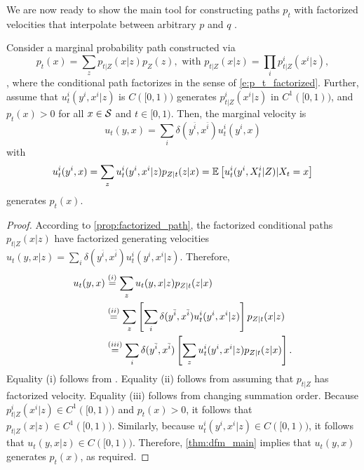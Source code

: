 \documentclass{fairmeta}
\renewcommand{\eqref}[1]{\labelcref{#1}}
\numberwithin{equation}{section}
\begin{document}
We are now ready to show the main tool for constructing paths $p_t$ with factorized velocities that interpolate between arbitrary $p$ and $q$ \citep{campbell2024generative,gat2024discrete}.

\begin{myframe}\begin{theorem}\label{thm:factorized_conditional_marginals}
        Consider a marginal probability path constructed via
        \begin{equation}
    p_t(x)=\sum_z p_{t|Z}(x|z)p_Z(z), \text{ with } p_{t|Z}(x|z)=\prod_i p_{t|Z}^i(x^i|z),  
\end{equation}
\ie, where the conditional path factorizes in the sense of \cref{e:p_t_factorized}. Further, assume that $u_t^i(y^i,x^i|z)$ is $C([0,1))$ generates $p_{t|Z}^i(x^i|z)$ in $C^1([0,1))$, and $p_t(x)>0$ for all $x\in {\mathcal{S}}$ and $t\in[0,1)$. Then, the marginal velocity is \begin{equation}\label{e:u_t_factorized}
            u_t(y,x) = \sum_i \delta(y^{\bar{i}}, x^{\bar{i}})   u_t^i(y^i,x)
\end{equation}     
with 
\begin{equation}\label{e:marginal_factorized_conditional_velocities}
u_t^i(y^i,x) =  \sum_z u_t^i(y^i,x^i|z)p_{Z|t}(z|x) =\mathbb{E}\left [u_t^i(y^i,X_t^i|Z) \vert X_t=x\right ]
\end{equation}
generates $p_t(x)$.
    \end{theorem}
\end{myframe}
\begin{proof}
According to \cref{prop:factorized_path}, the factorized conditional paths $p_{t|Z}(x|z)$ have factorized generating velocities $u_t(y,x|z) = \sum_i \delta(y^{\bar{i}}, x^{\bar{i}})  u_t^i(y^i,x^i|z)$.
Therefore, 
    \begin{align*}
        u_t(y,x) &\overset{(i)}{=} \sum_z u_t(y,x|z)p_{Z|t}(z|x) \\
        &\overset{(ii)}{=} \sum_z \left [\sum_i \delta(y^{\bar{i}}, x^{\bar{i}}) u_t^i(y^i,x^i|z)\right ]p_{Z|t}(x|z) \\
        &\overset{(iii)}{=} \sum_i \delta(y^{\bar{i}}, x^{\bar{i}})  \left [ \sum_z u_t^i(y^i,x^i|z)p_{Z|t}(z|x) \right ]. 
    \end{align*}
    Equality (i) follows from \eqref{e:u_t_discrete}.
    Equality (ii) follows from assuming that $p_{t|Z}$ has factorized velocity.
    Equality (iii) follows from changing summation order.
    Because $p^i_{t|Z}(x^i|z) \in C^1([0,1))$ and $p_t(x)>0$, it follows that $p_{t|Z}(x|z)\in C^1([0,1))$.
    Similarly, because $u_t^i(y^i,x^i|z) \in C([0,1))$, it follows that $u_t(y,x|z) \in C([0,1))$.
    Therefore, \cref{thm:dfm_main} implies that $u_t(y,x)$ generates $p_t(x)$, as required.
\end{proof}
\end{document}
